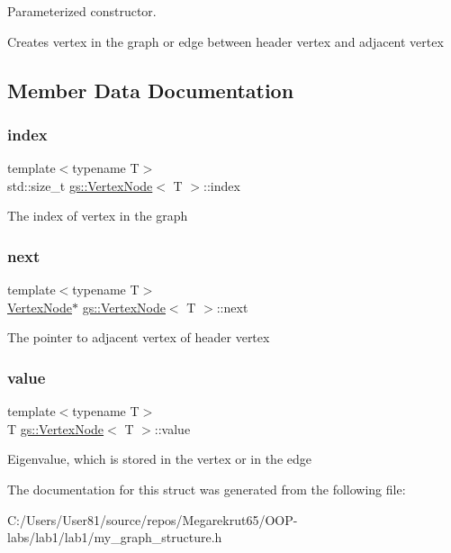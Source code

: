 Parameterized constructor. 

Creates vertex in the graph or edge between header vertex and adjacent vertex 

\subsection{Member Data Documentation}
\mbox{\label{structgs_1_1_vertex_node_a8dd82fa9a0b37a0194368dcd7752b04a}} 
\subsubsection{\texorpdfstring{index}{index}}
{\footnotesize\ttfamily template$<$typename T$>$ \\
std\+::size\+\_\+t \mbox{\hyperlink{structgs_1_1_vertex_node}{gs\+::\+Vertex\+Node}}$<$ T $>$\+::index}

The index of vertex in the graph \mbox{\label{structgs_1_1_vertex_node_a7fc257ce53eb77e180531b39bb303250}} 
\subsubsection{\texorpdfstring{next}{next}}
{\footnotesize\ttfamily template$<$typename T$>$ \\
\mbox{\hyperlink{structgs_1_1_vertex_node}{Vertex\+Node}}$\ast$ \mbox{\hyperlink{structgs_1_1_vertex_node}{gs\+::\+Vertex\+Node}}$<$ T $>$\+::next}

The pointer to adjacent vertex of header vertex \mbox{\label{structgs_1_1_vertex_node_a0bc246c7c0bfbea6354d90c704761fd3}} 
\subsubsection{\texorpdfstring{value}{value}}
{\footnotesize\ttfamily template$<$typename T$>$ \\
T \mbox{\hyperlink{structgs_1_1_vertex_node}{gs\+::\+Vertex\+Node}}$<$ T $>$\+::value}

Eigenvalue, which is stored in the vertex or in the edge 

The documentation for this struct was generated from the following file\+:\begin{DoxyCompactItemize}
\item 
C\+:/\+Users/\+User81/source/repos/\+Megarekrut65/\+O\+O\+P-\/labs/lab1/lab1/my\+\_\+graph\+\_\+structure.\+h\end{DoxyCompactItemize}

